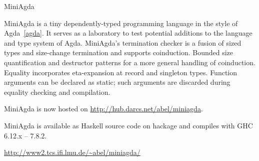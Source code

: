 \begin{hcarentry}{MiniAgda}
\makeheader

MiniAgda is a tiny dependently-typed programming language in the style
of Agda~\cref{agda}. It serves as a laboratory to test 
potential additions to the
language and type system of Agda. MiniAgda's termination checker is a
fusion of sized types and size-change termination and supports
coinduction. Bounded size quantification and destructor
patterns for a more general handling of coinduction.
Equality incorporates eta-expansion at record and
singleton types. Function arguments can be declared as static; such
arguments are discarded during equality checking and compilation.

MiniAgda is now hosted on \url{http://hub.darcs.net/abel/miniagda}.
 
MiniAgda is available as Haskell source code on hackage and compiles with GHC
6.12.x -- 7.8.2. 

\FurtherReading
  \url{http://www2.tcs.ifi.lmu.de/~abel/miniagda/}
\end{hcarentry}
